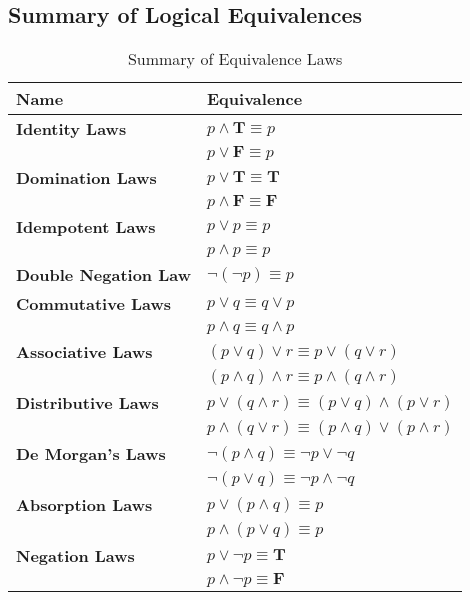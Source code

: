 \subsection{Summary of Logical Equivalences}
\begin{table}[H]
\centering
\caption{Summary of Equivalence Laws}\label{tab:identlaws}
\def\arraystretch{1.4}
\begin{tabular}{p{}p{}}
\toprule
Name  & Equivalence \\ \midrule
\textbf{Identity Laws} & \(p \wedge \mathbf{T} \equiv p\) \\
\textbf{} & \(p \vee \mathbf{F} \equiv p\) \\\midrule
\textbf{Domination Laws} & \(p \vee \mathbf{T} \equiv \mathbf{T}\) \\
\textbf{} &  \(p \wedge \mathbf{F} \equiv \mathbf{F}\) \\\midrule
\textbf{Idempotent Laws} & \( p \vee p \equiv p \) \\
\textbf{} &  \(p \wedge p \equiv p\)  \\\midrule
\textbf{Double Negation Law} & \(\neg(\neg p) \equiv p\) \\\midrule
\textbf{Commutative Laws} & \( p \vee q \equiv q \vee p \) \\
\textbf{} & \(p \wedge q \equiv q \wedge p \) \\\midrule
\textbf{Associative Laws} & \( (p \vee q) \vee r \equiv p \vee(q \vee r) \) \\
\textbf{} & \((p \wedge q) \wedge r \equiv p \wedge(q \wedge r)\)  \\\midrule
\textbf{Distributive Laws} & \(p \vee(q \wedge r) \equiv(p \vee q) \wedge(p \vee r)\) \\
\textbf{} & \(p \wedge(q \vee r) \equiv(p \wedge q) \vee(p \wedge r)\) \\ \midrule
\textbf{De Morgan's Laws} & \(\neg(p \wedge q) \equiv \neg p \vee \neg q\) \\
\textbf{} & \(\neg(p \vee q) \equiv \neg p \wedge \neg q\) \\\midrule
\textbf{Absorption Laws} & \(p \vee(p \wedge q) \equiv p\) \\
\textbf{} & \(p \wedge(p \vee q) \equiv p\) \\\midrule
\textbf{Negation Laws} & \(p \vee \neg p \equiv \mathbf{T}\) \\
\textbf{} & \(p \wedge \neg p \equiv \mathbf{F}\) \\ \bottomrule
\end{tabular}

\end{table}
